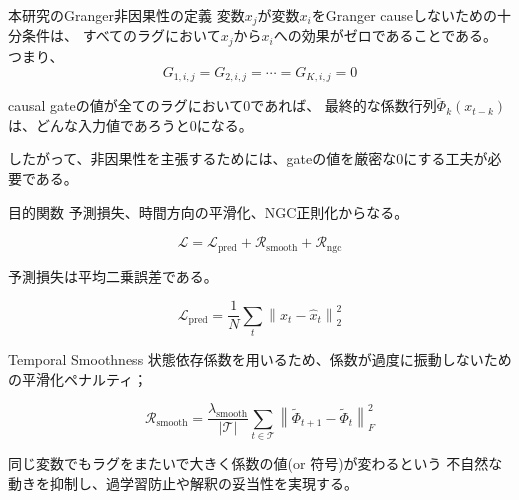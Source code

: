 \documentclass[dvipdfmx,11pt]{beamer}
\begin{document}
\begin{frame}{本研究のGranger非因果性の定義}
  変数$x_j$が変数$x_i$をGranger causeしないための十分条件は、
  すべてのラグにおいて$x_j$から$x_i$への効果がゼロであることである。
  つまり、
  \[
    G_{1,i,j} = G_{2,i,j} = \cdots = G_{K,i,j} = 0
  \]

  causal gateの値が全てのラグにおいて0であれば、
  最終的な係数行列$\tilde{\Phi}_k(x_{t-k})$は、どんな入力値であろうと0になる。

  したがって、非因果性を主張するためには、gateの値を厳密な0にする工夫が必要である。
\end{frame}




\begin{frame}{目的関数}
  予測損失、時間方向の平滑化、NGC正則化からなる。

  \[
    \mathcal{L}
    =
    \mathcal{L}_{\mathrm{pred}}
    +
    \mathcal{R}_{\mathrm{smooth}}
    +
    \mathcal{R}_{\mathrm{ngc}}
  \]

  \vspace{0.3em}

  予測損失は平均二乗誤差である。

  \[
    \mathcal{L}_{\mathrm{pred}}
    =
    \frac{1}{N}
    \sum_t
    \left\|
      x_t - \hat{x}_t
    \right\|_2^2
  \]

\end{frame}


\begin{frame}{Temporal Smoothness}
  状態依存係数を用いるため、係数が過度に振動しないための平滑化ペナルティ；

  \[
    \mathcal{R}_{\mathrm{smooth}}
    =
    \frac{\lambda_{\mathrm{smooth}}}{|\mathcal{T}|}
    \sum_{t \in \mathcal{T}}
    \left\|
      \tilde{\Phi}_{t+1}
      -
      \tilde{\Phi}_t
    \right\|_F^2
  \]

 同じ変数でもラグをまたいで大きく係数の値(or 符号)が変わるという
 不自然な動きを抑制し、過学習防止や解釈の妥当性を実現する。
\end{frame}
\end{document}
